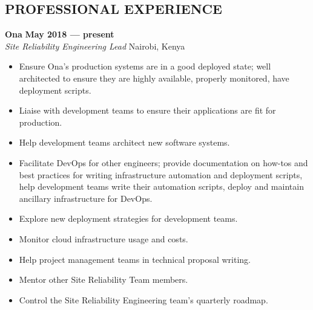 \documentclass{res}
\begin{document}
\thispagestyle{empty} %

\address{P.O. Box 55050(00200) \\ Nairobi, Kenya \\ +254715023805}

\address{jason@rogena.me}


\begin{resume}

	\section{PROFESSIONAL EXPERIENCE}

	\vspace{8pt}
	\textbf{Ona} \hfill        \textbf{May 2018 --- present} \\
	\emph{Site Reliability Engineering Lead}       \hfill  Nairobi, Kenya
	\begin{itemize} \itemsep -2pt %
		\item Ensure Ona’s production systems are in a good deployed state; well architected to ensure they are highly available, properly monitored, have deployment scripts.
		\item Liaise with development teams to ensure their applications are fit for production.
		\item Help development teams architect new software systems.
		\item Facilitate DevOps for other engineers; provide documentation on how-tos and best practices for writing infrastructure automation and deployment scripts, help development teams write their automation scripts, deploy and maintain ancillary infrastructure for DevOps.
		\item Explore new deployment strategies for development teams.
		\item Monitor cloud infrastructure usage and costs.
		\item Help project management teams in technical proposal writing.
		\item Mentor other Site Reliability Team members.
		\item Control the Site Reliability Engineering team’s quarterly roadmap.
	\end{itemize} \vspace{-4pt}


\end{resume}
\end{document}
